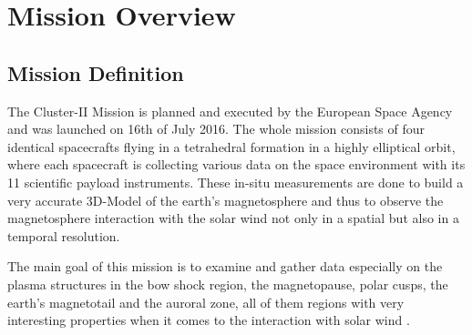 \section{Mission Overview}

\subsection{Mission Definition}
The Cluster-II Mission is planned and executed by the European Space Agency and was launched on 16th of July 2016. The whole mission consists of four identical spacecrafts flying in a tetrahedral formation in a highly elliptical orbit, where each spacecraft is collecting various data on the space environment with its 11 scientific payload instruments. These in-situ measurements are done to build a very accurate 3D-Model of the earth's magnetosphere and thus to observe the magnetosphere interaction with the solar wind not only in a spatial but also in a temporal resolution.

The main goal of this mission is to examine and gather data especially on the plasma structures in the bow shock region, the magnetopause, polar cusps, the earth's magnetotail and the auroral zone, all of them regions with very interesting properties when it comes to the interaction with solar wind \citep{ESA:clusterWebsite}.

